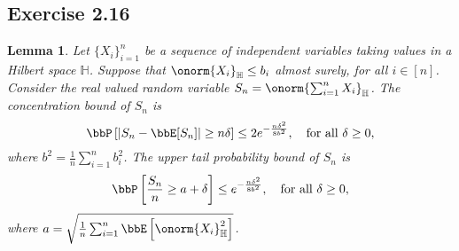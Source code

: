 \documentclass[11pt]{article}
\newcommand{\off}[1]{\left[#1\right]}
\theoremstyle{plain}
\newtheorem{lem}{Lemma}
\theoremstyle{definition}
\begin{document}
    \subsection{Exercise 2.16}
    \begin{lem}
    	Let $\{X_i\}_{i=1}^n$ be a sequence of independent variables taking values in a Hilbert space $\mathbb{H}$. Suppose that $\onorm{X_i}_{\mathbb{H}} \leq b_i$ almost surely, for all $i \in [n]$. Consider the real valued random variable $S_n = \onorm{\sum_{i=1}^n X_i}_{\mathbb{H}}$. The concentration bound of $S_n$ is
    	\begin{equation}\label{eq:e216a}
    		\bbP\off{|S_n - \bbE[S_n]| \geq n\delta} \leq 2e^{-\frac{n\delta^2}{8b^2}}, \quad \text{for all } \delta \geq 0,
    	\end{equation}
    	where $b^2 = \frac{1}{n} \sum_{i=1}^n b_i^2$. The upper tail probability bound of $S_n$ is
    	\begin{equation}\label{eq:e216b}
    		\bbP \off{\frac{S_n}{n} \geq a + \delta} \leq e^{-\frac{n\delta^2}{8b^2}}, \quad \text{for all }\delta \geq 0,
    	\end{equation}
    	where $a = \sqrt{\frac{1}{n} \sum_{i=1}^n \bbE \off{\onorm{X_i}^2_{\mathbb{H}}} }$.
    \end{lem} 
    
\end{document}
